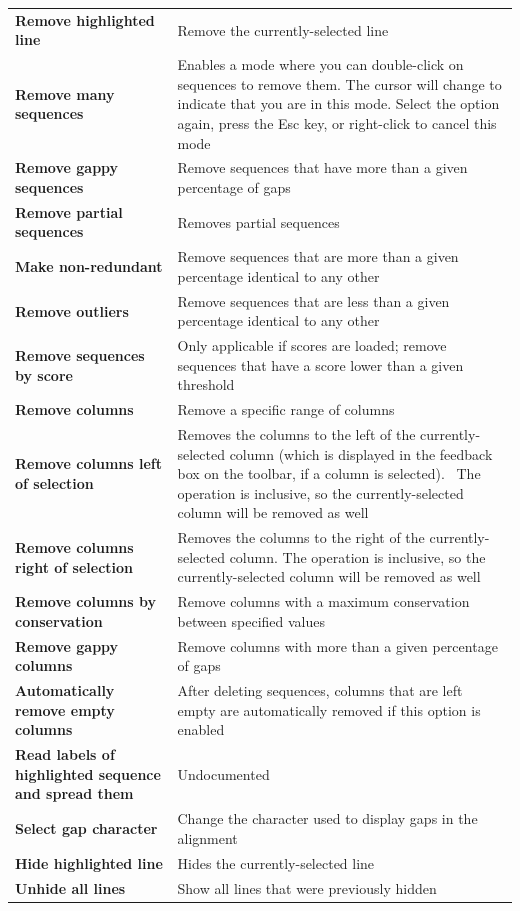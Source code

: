 \documentclass[letterpaper]{article}
\begin{document}
\begin{supertabular}{>{\bfseries}p{0.4\textwidth} p{0.6\textwidth}}
Remove highlighted line  &
Remove the currently-selected line\\
Remove many sequences  &
Enables a mode where you can double-click on sequences to remove them. The cursor will change to indicate that you are in this mode. Select the option again, press the Esc key, or right-click to cancel this mode\\
Remove gappy sequences  &
Remove sequences that have more than a given percentage of gaps\\
Remove partial sequences  &
Removes partial sequences\\
Make non-redundant  &
Remove sequences that are more than a given percentage identical to any other\\
Remove outliers  &
Remove sequences that are less than a given percentage identical to any other\\
Remove sequences by score  &
Only applicable if scores are loaded; remove sequences that have a score lower than a given threshold\\
Remove columns  &
Remove a specific range of columns\\
Remove columns left of selection  &
Removes the columns to the left of the currently-selected column (which is displayed in the feedback box on the toolbar, if a column is selected). \ The operation is inclusive, so the currently-selected column will be removed as well\\
Remove columns right of selection  &
Removes the columns to the right of the currently-selected column. The operation is inclusive, so the currently-selected column will be removed as well\\
Remove columns by conservation  &
Remove columns with a maximum conservation between specified values\\
Remove gappy columns  &
Remove columns with more than a given percentage of gaps\\
Automatically remove empty columns  &
After deleting sequences, columns that are left empty are automatically removed if this option is enabled\\
Read labels of highlighted sequence and spread them  &
Undocumented\\
Select gap character  &
Change the character used to display gaps in the alignment\\
Hide highlighted line  &
Hides the currently-selected line\\
Unhide all lines  &
Show all lines that were previously hidden\\
\end{supertabular}
\end{document}
